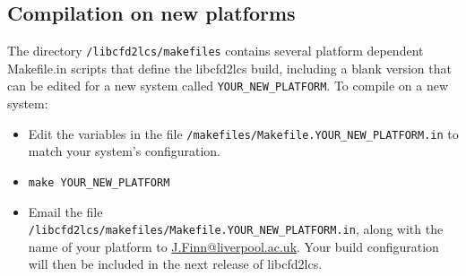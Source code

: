 \documentclass[letterpaper,12pt]{article}
\begin{document}
\subsection*{Compilation on new platforms}
The directory \verb|/libcfd2lcs/makefiles| contains several platform dependent Makefile.in scripts that define the libcfd2lcs build, including a blank version that can be edited for a new system called \verb|YOUR_NEW_PLATFORM|.  To compile on a new system: 
\begin{itemize}
 \item Edit the variables in the file \verb|/makefiles/Makefile.YOUR_NEW_PLATFORM.in| to match your system's configuration.
 \item \verb|make YOUR_NEW_PLATFORM|
 \item Email the file\\ \verb|/libcfd2lcs/makefiles/Makefile.YOUR_NEW_PLATFORM.in|, along with the name of your platform to \href{mailto:J.Finn@liverpool.ac.uk}{J.Finn@liverpool.ac.uk}.  Your build configuration will then be included in the next release of libcfd2lcs.
\end{itemize}
\end{document}
